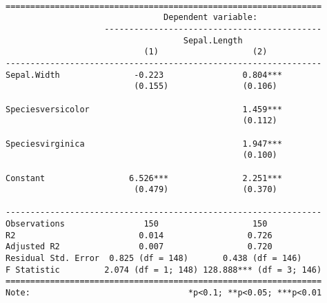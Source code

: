 \documentclass[
  letterpaper,
  DIV=11,
  numbers=noendperiod]{scrartcl}
\begin{document}
\begin{verbatim}

================================================================
                                Dependent variable:             
                    --------------------------------------------
                                    Sepal.Length                
                            (1)                   (2)           
----------------------------------------------------------------
Sepal.Width               -0.223                0.804***        
                          (0.155)               (0.106)         
                                                                
Speciesversicolor                               1.459***        
                                                (0.112)         
                                                                
Speciesvirginica                                1.947***        
                                                (0.100)         
                                                                
Constant                 6.526***               2.251***        
                          (0.479)               (0.370)         
                                                                
----------------------------------------------------------------
Observations                150                   150           
R2                         0.014                 0.726          
Adjusted R2                0.007                 0.720          
Residual Std. Error  0.825 (df = 148)       0.438 (df = 146)    
F Statistic         2.074 (df = 1; 148) 128.888*** (df = 3; 146)
================================================================
Note:                                *p<0.1; **p<0.05; ***p<0.01
\end{verbatim}
\end{document}
